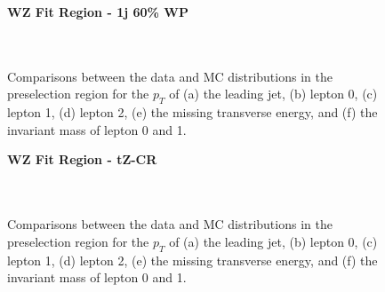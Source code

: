 \begin{figure}[H]
    \centering
    \textbf{WZ Fit Region - 1j 60\% WP}\\
    \\
    \\
    \caption{Comparisons between the data and MC distributions in the preselection region for the $p_T$ of (a) the leading jet, (b) lepton 0, (c) lepton 1, (d) lepton 2, (e) the missing transverse energy, and (f) the invariant mass of lepton 0 and 1.}
    \label{kin:WP_1j_60}    
\end{figure}

\begin{figure}[H]
    \centering
    \textbf{WZ Fit Region - tZ-CR}\\
    \\
    \\
    \caption{Comparisons between the data and MC distributions in the preselection region for the $p_T$ of (a) the leading jet, (b) lepton 0, (c) lepton 1, (d) lepton 2, (e) the missing transverse energy, and (f) the invariant mass of lepton 0 and 1.}
    \label{kin:tZ_CR_1j}
\end{figure}

